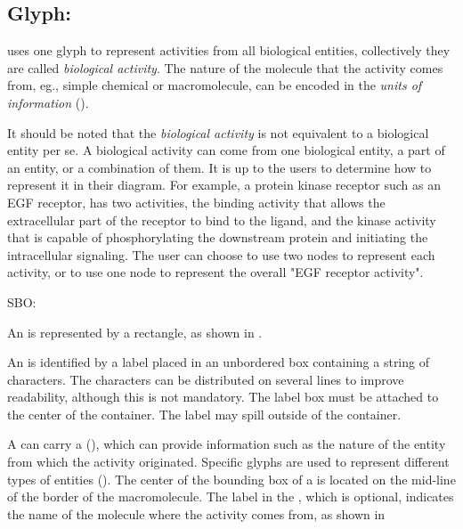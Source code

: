 \subsection{Glyph: }
\label{sec:af:biologicalActivity}


\SBGNAFLone uses one glyph to represent activities from all biological entities, collectively they are called \emph{biological activity}. The nature of the molecule that the activity comes from, eg., simple chemical or macromolecule, can be encoded in the \emph{units of information} (). 

It should be noted that the \emph{biological activity} is not equivalent to a biological entity per se.  A biological activity can come from one biological entity, a part of an entity, or a combination of  them.  It is up to the users to determine how to represent it in their diagram.  For example, a protein kinase receptor such as an EGF receptor, has two activities, the binding activity that allows the extracellular part of the receptor to bind to the ligand, and the kinase activity that is capable of phosphorylating the downstream protein and initiating the intracellular signaling.  The user can choose to use two nodes to represent each activity, or to use one node to represent the overall "EGF receptor activity". 

\begin{glyphDescription}

\glyphSboTerm SBO:

\glyphContainer An  is represented by a rectangle, as shown in .

\glyphLabel An  is identified by a label placed in an unbordered box containing a string of characters.  The characters can be distributed on several lines to improve readability, although this is not mandatory.  The label box must be attached to the center of the container.  The label may spill outside of the container.

\glyphAux A  can carry a  (), which can provide information such as the nature of the entity from which the activity originated.  Specific glyphs are used to represent different types of entities ().  The center of the bounding box of a  is located on the mid-line of the border of the macromolecule.  The label in the , which is optional, indicates the name of the molecule where the activity comes from, as shown in 

\end{glyphDescription}

